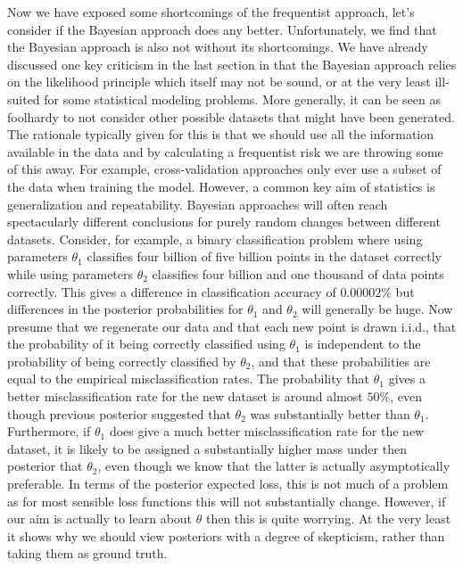 Now we have exposed some shortcomings of the frequentist approach, let's consider if the Bayesian approach does any better.
Unfortunately, we find that the Bayesian approach is also not without its shortcomings.  We have already discussed one
key criticism in the last section in that the Bayesian approach relies on the likelihood principle which itself may not
be sound, or at the very least ill-suited for some statistical modeling problems.  More generally, it can be seen as
foolhardy to not consider other possible datasets that might have been generated.  The rationale typically given for
this is that we should use all the information available in the data and by calculating a frequentist risk we are throwing
some of this away.  For example, cross-validation approaches only ever use a subset of the data when training the model.
However, a common key aim of statistics is generalization and repeatability.  Bayesian approaches will often reach
spectacularly different conclusions for purely random changes between different datasets.  Consider, for example, a binary
classification
problem where using parameters $\theta_1$ classifies four billion of five billion points in the dataset correctly 
while using parameters $\theta_2$
classifies four billion and one thousand of data points correctly.  This gives a difference in classification accuracy 
of $0.00002\%$ but differences in the posterior probabilities for $\theta_1$ and $\theta_2$ will generally
be huge.
Now presume that we regenerate our data and that each new point is drawn i.i.d.,
 that the probability of it being correctly classified using $\theta_1$ is independent to the probability of
being correctly classified by $\theta_2$, and that these probabilities are equal to the empirical misclassification
rates.  The probability that $\theta_1$ gives a better misclassification rate for the new dataset is around
almost $50\%$, even though previous posterior suggested that $\theta_2$ was substantially better than $\theta_1$.
Furthermore, if $\theta_1$ does give a much better misclassification rate for the new dataset, it is likely 
to be assigned a substantially higher mass under then posterior that $\theta_2$, even though we know that 
the latter is actually asymptotically preferable.  In terms of the posterior expected loss, this is not much of a problem
as for most sensible loss functions this will not substantially change.  However, if our aim is actually to learn 
about $\theta$ then this is quite worrying.  At the very least it shows why we should view posteriors with
a degree of skepticism, rather than taking them as ground truth.

